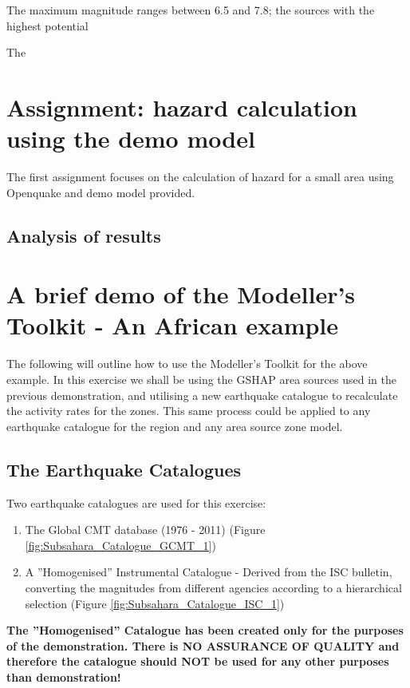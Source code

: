 The maximum magnitude ranges between 6.5 and 7.8; the sources with the
highest potential 

The 

%
\section{Assignment: hazard calculation using the demo model}
The first assignment focuses on the calculation of hazard for a small area 
using Openquake and demo model provided.


\clearpage
%
\subsection{Analysis of results}













\section{A brief demo of the Modeller's Toolkit - An African example}
The following will outline how to use the Modeller's Toolkit for the above 
example. In this exercise we shall be using the GSHAP area sources used in 
the previous demonstration, and utilising a new earthquake catalogue to 
recalculate the activity rates for the zones. This same process could be 
applied to any earthquake catalogue for the region and any area source 
zone model. 

\subsection{The Earthquake Catalogues}

Two earthquake catalogues are used for this exercise:
\begin{enumerate}
\item The Global CMT database (1976 - 2011) (Figure 
    \ref{fig:Subsahara_Catalogue_GCMT_1})
\item A ''Homogenised'' Instrumental Catalogue - Derived from the ISC 
    bulletin, converting the magnitudes from different agencies 
    according to a hierarchical selection (Figure 
    \ref{fig:Subsahara_Catalogue_ISC_1})
\end{enumerate}
\textbf{The ''Homogenised'' Catalogue has been created only for the 
purposes of the demonstration. There is NO ASSURANCE OF QUALITY and 
therefore the catalogue should NOT be used for any other purposes 
than demonstration!}

